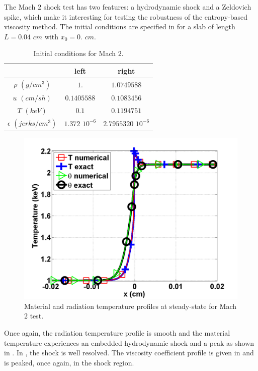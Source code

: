 The Mach $2$ shock test has two features: a hydrodynamic shock and a Zeldovich spike, which make it interesting for testing the robustness of the entropy-based viscosity method. The initial conditions are specified in  for a slab of length $L=0.04$ $cm$ with $x_0 = 0.$ $cm$.
\begin{table}[H]
\caption{\label{tbl:table5} Initial conditions for Mach $2$.}
\begin{center}
\begin{tabular}{|c|c|c|}
\hline 
 & left  & right \\ \hline
$\rho$ $(g/cm^3)$ &$1.$ & $1.0749588$ \\ \hline
$u$ $(cm/sh)$& $0.1405588$ & $0.1083456$ \\ \hline
$T$ $(keV)$& $0.1$ & $0.1194751$\\ \hline
$\epsilon$ $(jerks/cm^3)$ & $1.372$ $10^{-6}$ & $2.7955320$ $10^{-6}$\\
\hline
\end{tabular}  
\end{center}  
\end{table}
\begin{figure}[H]
                \centering
                \includegraphics[width=\textwidth]{figures/Mach_2_nel_2000_temperature.png}
        \caption{Material and radiation temperature profiles at steady-state for Mach 2 test.}\label{fig:Mach2_temp}
\end{figure}
Once again, the radiation temperature profile is smooth and the material temperature experiences an embedded hydrodynamic shock and a peak as shown in . In , the shock is well resolved. The viscosity coefficient profile is given in  and is peaked, once again, in the shock region. 

